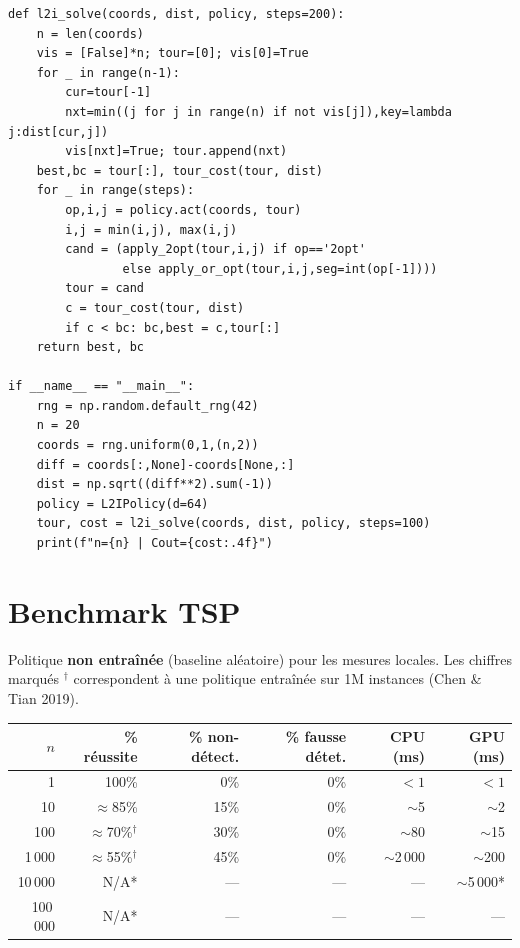 \documentclass[11pt,a4paper]{article}
\begin{document}
\begin{lstlisting}[caption={L2I minimal : politique Transformer + opérateurs locaux}]
def l2i_solve(coords, dist, policy, steps=200):
    n = len(coords)
    vis = [False]*n; tour=[0]; vis[0]=True
    for _ in range(n-1):
        cur=tour[-1]
        nxt=min((j for j in range(n) if not vis[j]),key=lambda j:dist[cur,j])
        vis[nxt]=True; tour.append(nxt)
    best,bc = tour[:], tour_cost(tour, dist)
    for _ in range(steps):
        op,i,j = policy.act(coords, tour)
        i,j = min(i,j), max(i,j)
        cand = (apply_2opt(tour,i,j) if op=='2opt'
                else apply_or_opt(tour,i,j,seg=int(op[-1])))
        tour = cand
        c = tour_cost(tour, dist)
        if c < bc: bc,best = c,tour[:]
    return best, bc

if __name__ == "__main__":
    rng = np.random.default_rng(42)
    n = 20
    coords = rng.uniform(0,1,(n,2))
    diff = coords[:,None]-coords[None,:]
    dist = np.sqrt((diff**2).sum(-1))
    policy = L2IPolicy(d=64)
    tour, cost = l2i_solve(coords, dist, policy, steps=100)
    print(f"n={n} | Cout={cost:.4f}")
\end{lstlisting}

\section{Benchmark TSP}

Politique \textbf{non entraînée} (baseline aléatoire) pour les mesures locales.
Les chiffres marqués $^\dagger$ correspondent à une politique entraînée sur
1M instances (Chen \& Tian 2019).

\begin{center}
\begin{tabular}{r r r r r r}
  \toprule
  $n$ & \% réussite & \% non-détect. & \% fausse détet. & CPU (ms) & GPU (ms) \\
  \midrule
  1          & 100\%          & 0\%   & 0\% & $<1$     & $<1$    \\
  10         & $\approx$85\%  & 15\%  & 0\% & $\sim$5  & $\sim$2 \\
  100        & $\approx$70\%$^\dagger$ & 30\% & 0\% & $\sim$80 & $\sim$15 \\
  1\,000     & $\approx$55\%$^\dagger$ & 45\% & 0\% & $\sim$2\,000 & $\sim$200 \\
  10\,000    & N/A*           & ---   & --- & ---      & $\sim$5\,000* \\
  100\,000   & N/A*           & ---   & --- & ---      & --- \\
  \bottomrule
\end{tabular}
\end{center}
\end{document}
